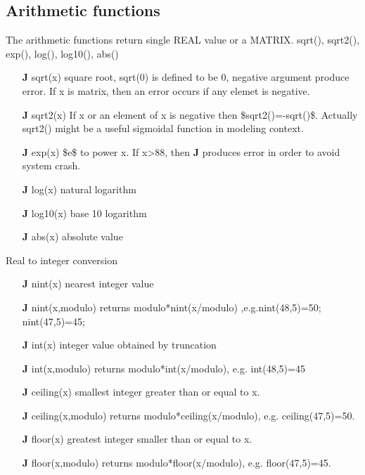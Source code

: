 \subsection{Arithmetic functions}
\label{arfu}
The arithmetic functions return single REAL value or a MATRIX.
\textcolor{VioletRed}{sqrt}(), \textcolor{VioletRed}{sqrt2}(), \textcolor{VioletRed}{exp}(), \textcolor{VioletRed}{log}(), \textcolor{VioletRed}{log10}(), \textcolor{VioletRed}{abs}()
\begin{itemize}
\item[\textbf{J}] \textcolor{VioletRed}{sqrt}(x) square root, \textcolor{VioletRed}{sqrt}(0) is defined to be 0, negative argument produce error.
If {x} is matrix, then an error occurs if any elemet is negative.
\item[\textbf{J}] \textcolor{VioletRed}{sqrt2}(x) If {x} or an element of {x} is negative then \$\textcolor{VioletRed}{sqrt2}()=-\textcolor{VioletRed}{sqrt}()\$. Actually \textcolor{VioletRed}{sqrt2}() might be a
useful sigmoidal function in modeling context.
\item[\textbf{J}] \textcolor{VioletRed}{exp}(x) \$e\$ to power {x}. If {x}>88, then \textbf{J} produces error in order to avoid system
crash.
\item[\textbf{J}] \textcolor{VioletRed}{log}(x) natural logarithm
\item[\textbf{J}] \textcolor{VioletRed}{log10}(x) base 10 logarithm
\item[\textbf{J}] \textcolor{VioletRed}{abs}(x) absolute value
\end{itemize}
Real to integer conversion
\begin{itemize}
\item[\textbf{J}] \textcolor{VioletRed}{nint}(x) nearest integer value
\item[\textbf{J}] \textcolor{VioletRed}{nint}(x,modulo) returns modulo*nint(x/modulo) ,e.g.\textcolor{VioletRed}{nint}(48,5)=50; \textcolor{VioletRed}{nint}(47,5)=45;
\item[\textbf{J}] \textcolor{VioletRed}{int}(x) integer value obtained by truncation
\item[\textbf{J}] \textcolor{VioletRed}{int}(x,modulo) returns modulo*int(x/modulo), e.g. \textcolor{VioletRed}{int}(48,5)=45
\item[\textbf{J}] \textcolor{VioletRed}{ceiling}(x) smallest integer greater than or equal to {x}.
\item[\textbf{J}] \textcolor{VioletRed}{ceiling}(x,modulo) returns modulo*ceiling(x/modulo), e.g. \textcolor{VioletRed}{ceiling}(47,5)=50.
\item[\textbf{J}] \textcolor{VioletRed}{floor}(x) greatest integer smaller than or equal to {x}.
\item[\textbf{J}] \textcolor{VioletRed}{floor}(x,modulo) returns modulo*floor(x/modulo), e.g. \textcolor{VioletRed}{floor}(47,5)=45.
\end{itemize}
